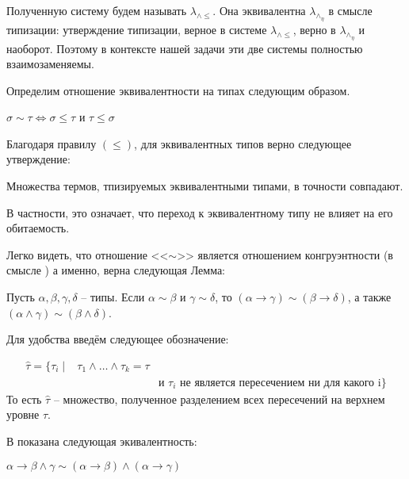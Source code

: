 \documentclass[../main.tex]{subfiles}
\begin{document}
Полученную систему будем называть $\lambda_{\wedge \leqslant}$. Она эквивалентна $\lambda_\wedge_\eta$ в смысле типизации: утверждение типизации, верное в системе  $\lambda_{\wedge \leqslant}$, верно в $\lambda_\wedge_\eta$ и наоборот. Поэтому в контексте нашей задачи эти две системы полностью взаимозаменяемы.

Определим отношение эквивалентности на типах следующим образом. 

\begin{definition}
$\sigma \sim \tau \iff \sigma \leqslant \tau$ и $\tau \leqslant \sigma$
\end{definition}

Благодаря правилу $(\leqslant)$, для эквивалентных типов верно следующее утверждение:

\begin{lemma}
Множества термов, тпизируемых эквивалентными типами, в точности совпадают.
\end{lemma}

В частности, это означает, что переход к эквивалентному типу не влияет на его обитаемость.

Легко видеть, что отношение <<$\sim$>> является отношением конгруэнтности (в смысле \cite{barendregt_93}) а именно, верна следующая Лемма:
\begin{lemma}
Пусть $\alpha, \beta, \gamma, \delta$ -- типы. 
Если $\alpha \sim \beta$ и $\gamma \sim \delta$, то $(\alpha \to \gamma) \sim (\beta \to \delta)$, а также $(\alpha \wedge \gamma) \sim (\beta \wedge \delta)$.
\end{lemma}



Для удобства введём следующее обозначение: 
\begin{definition}
\begin{align*}
\hat{\tau} = \{\tau_i \mid & \tau_1 \wedge \dots \wedge \tau_k = \tau \\
                               && \text{и $\tau_i$ не является пересечением ни для какого i} \}
\end{align*}
То есть $\hat{\tau}$ -- множество, полученное разделением всех пересечений на верхнем уровне $\tau$.
\end{definition}


В \cite{hindley_82} показана следующая экивалентность: 
\begin{lemma}
$\alpha \to \beta \wedge \gamma \sim (\alpha \to \beta) \wedge (\alpha \to \gamma)$
\end{lemma}
\end{document}
